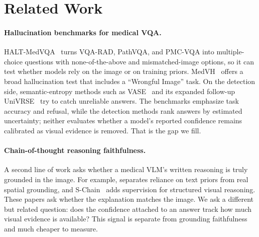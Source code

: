 \documentclass{article}
\begin{document}
\section{Related Work}
\paragraph{Hallucination benchmarks for medical VQA.}
HALT-MedVQA~\cite{halt_medvqa} turns VQA-RAD, PathVQA, and PMC-VQA into
multiple-choice questions with none-of-the-above and mismatched-image options, so
it can test whether models rely on the image or on training priors.
MedVH~\cite{medvh} offers a broad hallucination test that includes a ``Wrongful
Image'' task. On the detection side, semantic-entropy methods such as
VASE~\cite{vase_miccai2025} and its expanded follow-up
UniVRSE~\cite{univrse} try to catch unreliable answers. The benchmarks emphasize
task accuracy and refusal, while the detection
methods rank answers by estimated uncertainty; neither evaluates whether a model's
reported confidence remains calibrated as visual evidence is removed. That is the
gap we fill.

\paragraph{Chain-of-thought reasoning faithfulness.}
A second line of work asks whether a medical VLM's written reasoning is truly
grounded in the image. For example, \cite{eval_reasoning_faithfulness_medvlm}
separates reliance on text priors from real spatial grounding, and
S-Chain~\cite{schain} adds supervision for structured visual reasoning. These
papers ask whether the explanation matches the image. We ask a different but
related question: does the confidence attached to an answer track how much visual
evidence is available? This signal is separate from grounding faithfulness and much
cheaper to measure.
\end{document}
